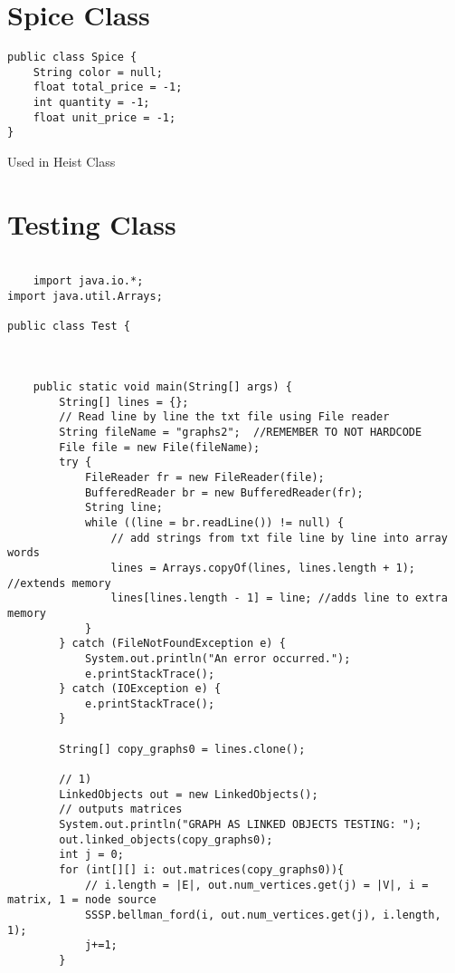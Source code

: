 \documentclass{article}
\begin{document}
    \section{Spice Class}
    \begin{lstlisting}
public class Spice {
    String color = null;
    float total_price = -1;
    int quantity = -1;
    float unit_price = -1;
}
    \end{lstlisting}
    Used in Heist Class
    
\section{Testing Class}
\begin{lstlisting}

    import java.io.*;
import java.util.Arrays;

public class Test {



    public static void main(String[] args) {
        String[] lines = {};
        // Read line by line the txt file using File reader
        String fileName = "graphs2";  //REMEMBER TO NOT HARDCODE
        File file = new File(fileName);
        try {
            FileReader fr = new FileReader(file);
            BufferedReader br = new BufferedReader(fr);
            String line;
            while ((line = br.readLine()) != null) {
                // add strings from txt file line by line into array words
                lines = Arrays.copyOf(lines, lines.length + 1); //extends memory
                lines[lines.length - 1] = line; //adds line to extra memory
            }
        } catch (FileNotFoundException e) {
            System.out.println("An error occurred.");
            e.printStackTrace();
        } catch (IOException e) {
            e.printStackTrace();
        }

        String[] copy_graphs0 = lines.clone();

        // 1)
        LinkedObjects out = new LinkedObjects();
        // outputs matrices
        System.out.println("GRAPH AS LINKED OBJECTS TESTING: ");
        out.linked_objects(copy_graphs0);
        int j = 0;
        for (int[][] i: out.matrices(copy_graphs0)){
            // i.length = |E|, out.num_vertices.get(j) = |V|, i = matrix, 1 = node source
            SSSP.bellman_ford(i, out.num_vertices.get(j), i.length, 1);
            j+=1;
        }


\end{lstlisting}
\end{document}
